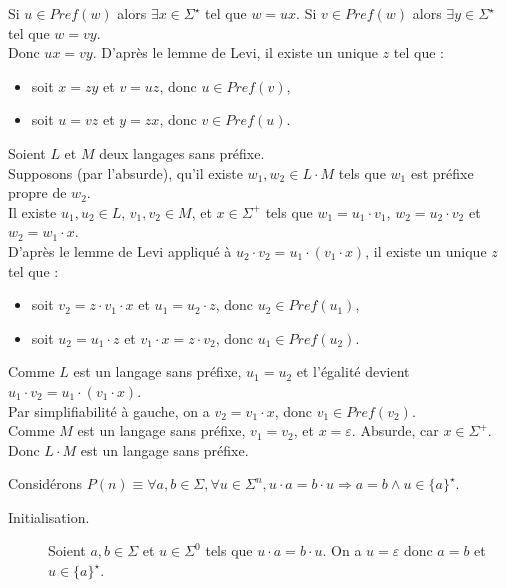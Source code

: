 \begin{corrections}
\begin{questions}
    Si $u \in \mathit{Pref}(w)$ alors $\exists x \in \Sigma^\star$ tel que $w = u x$.
    Si $v \in \mathit{Pref}(w)$ alors $\exists y \in \Sigma^\star$ tel que $w = v y$.\\
    Donc $u x = v y$. D'après le lemme de Levi, il existe un unique $z$ tel que :
    \begin{itemize}
    \item soit $x = z y$ et $v = u z$, donc $u \in \mathit{Pref}(v)$,
    \item soit $u = v z$ et $y = z x$, donc $v \in \mathit{Pref}(u)$.
    \end{itemize}

  \item
    Soient $L$ et $M$ deux langages sans préfixe. \\
    Supposons (par l'absurde), qu'il existe $w_1, w_2 \in L\cdot M$ tels que $w_1$ est préfixe propre de $w_2$.\\
    Il existe $u_1, u_2 \in L$, $v_1, v_2 \in M$, et $x \in \Sigma^+$ tels que
    $w_1 = u_1 \cdot v_1$, $w_2 = u_2 \cdot v_2$ et $w_2 = w_1\cdot x$. \\
    D'après le lemme de Levi appliqué à $u_2\cdot v_2 = u_1\cdot (v_1 \cdot x)$, il existe un unique $z$ tel que :
    \begin{itemize}
    \item soit $v_2 = z \cdot v_1 \cdot x$ et $u_1 = u_2 \cdot z$, donc $u_2 \in \mathit{Pref}(u_1)$,
    \item soit $u_2 = u_1 \cdot z$ et $v_1 \cdot x = z \cdot v_2$, donc $u_1 \in \mathit{Pref}(u_2)$.
    \end{itemize}
    Comme $L$ est un langage sans préfixe, $u_1 = u_2$ et l'égalité devient $u_1\cdot v_2 = u_1\cdot (v_1 \cdot x)$.\\
    Par simplifiabilité à gauche, on a $v_2 = v_1 \cdot x$, donc $v_1 \in \mathit{Pref}(v_2)$.\\
    Comme $M$ est un langage sans préfixe, $v_1 = v_2$, et $x=\varepsilon$. Absurde, car $x\in \Sigma^+$. \\
    Donc $L \cdot M$ est un langage sans préfixe.
  \item Considérons $P(n) \equiv \forall a, b \in \Sigma, \forall u \in \Sigma^n, u\cdot a = b\cdot u \Rightarrow a = b \land u \in \{a\}^\star$.
    \begin{description}
    \item[Initialisation.] Soient $a, b \in \Sigma$ et $u \in \Sigma^0$ tels que $u\cdot a = b\cdot u$. On a $u = \varepsilon$ donc $a = b$ et $u \in \{a\}^\star$.

\end{description}
\end{questions}
\end{corrections}
